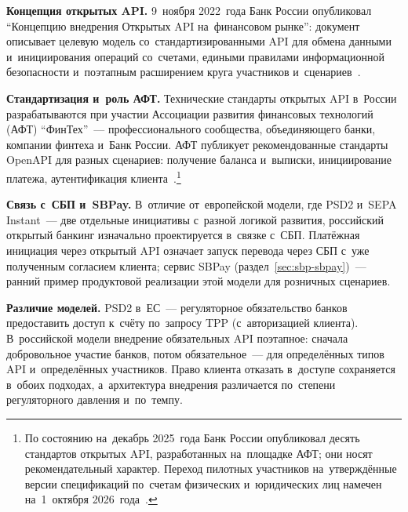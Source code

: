 \textbf{Концепция открытых API.} 9~ноября 2022~года Банк России опубликовал
\enquote{Концепцию внедрения Открытых API на~финансовом рынке}: документ
описывает целевую модель со~стандартизированными API для обмена данными
и~инициирования операций со~счетами, едиными правилами информационной
безопасности и~поэтапным расширением круга участников
и~сценариев~\cite{cbr-open-api-concept}.

\textbf{Стандартизация и~роль АФТ.} Технические стандарты открытых API в~России
разрабатываются при участии Ассоциации развития финансовых технологий (АФТ)
\enquote{ФинТех}~--- профессионального сообщества, объединяющего банки,
компании финтеха и~Банк России. АФТ публикует рекомендованные стандарты OpenAPI
для разных сценариев: получение баланса и~выписки, инициирование платежа,
аутентификация клиента~\cite{afe-open-api}.\footnote{По состоянию на~декабрь
  2025~года Банк России опубликовал десять стандартов открытых API, разработанных
  на~площадке АФТ; они носят рекомендательный характер. Переход пилотных
  участников на~утверждённые версии спецификаций по~счетам физических
  и~юридических лиц намечен на~1~октября
2026~года~\cite{aft-open-api-standards-2025}.}

\textbf{Связь с~СБП и~SBPay.} В~отличие от~европейской модели, где PSD2 и~SEPA
Instant~--- две отдельные инициативы с~разной логикой развития, российский
открытый банкинг изначально проектируется в~связке с~СБП. Платёжная инициация
через открытый API означает запуск перевода через СБП с~уже полученным
согласием клиента; сервис SBPay (раздел~\ref{sec:sbp-sbpay})~--- ранний пример
продуктовой реализации этой модели для розничных сценариев.

\textbf{Различие моделей.} PSD2 в~ЕС~--- регуляторное обязательство банков
предоставить доступ к~счёту по~запросу TPP (с~авторизацией клиента).
В~российской модели внедрение обязательных API поэтапное:
сначала добровольное участие банков, потом обязательное~--- для определённых
типов API и~определённых участников. Право клиента отказать в~доступе
сохраняется в~обоих подходах, а~архитектура внедрения различается по~степени
регуляторного давления и~по~темпу.


